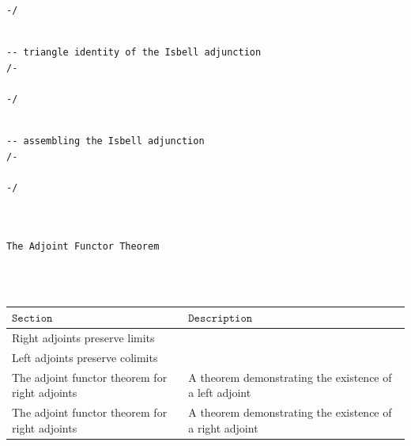 \documentclass{book}
\theoremstyle{definition}
\newcounter{lcounter}
\renewcommand{\chapter}[1]{
\newpage
{
\Huge 
\begin{center}
\ \\
\ \\
\thispagestyle{empty}
\texttt{#1}
\end{center}}
\ \\
\ \\
}
\begin{document}
{{\begin{center}
\begin{tcolorbox}[width=5in,colback={white},title={\begin{center}\texttt{Lean \thelcounter} \addtocounter{lcounter}{1}  \end{center}},colbacktitle=Blue,coltitle=black]
\begin{verbatim}
-/

\end{verbatim}
\end{tcolorbox}
\end{center}

\begin{center}
\begin{tcolorbox}[width=5in,colback={white},title={\begin{center}\texttt{Lean \thelcounter} \addtocounter{lcounter}{1}  \end{center}},colbacktitle=Blue,coltitle=black]
\begin{verbatim}

-- triangle identity of the Isbell adjunction
/-

-/

\end{verbatim}
\end{tcolorbox}
\end{center}

\begin{center}
\begin{tcolorbox}[width=5in,colback={white},title={\begin{center}\texttt{Lean \thelcounter} \addtocounter{lcounter}{1}  \end{center}},colbacktitle=Blue,coltitle=black]
\begin{verbatim}

-- assembling the Isbell adjunction
/-

-/

\end{verbatim}
\end{tcolorbox}
\end{center}

\chapter{The Adjoint Functor Theorem}

{\footnotesize
\begin{center}
\begin{tabular}{|| l || l ||} 
 \hline
 $\texttt{Section}$ & $\texttt{Description}$ \\
 \hline
\hline
Right adjoints preserve limits &  \\
\hline
Left adjoints preserve colimits &  \\
\hline
The adjoint functor theorem for right adjoints & A theorem demonstrating the existence of a left adjoint \\
\hline
The adjoint functor theorem for right adjoints & A theorem demonstrating the existence of a right adjoint  \\
\hline
\end{tabular}
\end{center}}
\ \\
\ \\

}}
\end{document}
